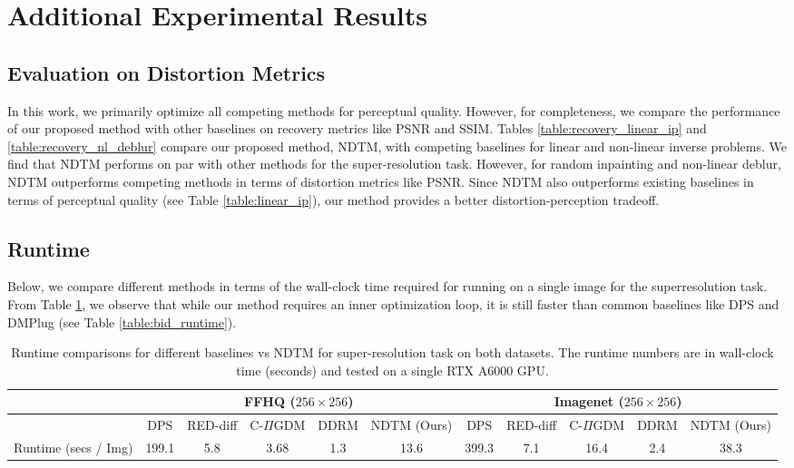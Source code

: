 \section{Additional Experimental Results}
\label{app:add_exp}

 \subsection{Evaluation on Distortion Metrics}
 In this work, we primarily optimize all competing methods for perceptual quality. However, for completeness, we compare the performance of our proposed method with other baselines on recovery metrics like PSNR and SSIM. Tables \ref{table:recovery_linear_ip} and \ref{table:recovery_nl_deblur} compare our proposed method, NDTM, with competing baselines for linear and non-linear inverse problems. We find that NDTM performs on par with other methods for the super-resolution task. However, for random inpainting and non-linear deblur, NDTM outperforms competing methods in terms of distortion metrics like PSNR. Since NDTM also outperforms existing baselines in terms of perceptual quality (see Table \ref{table:linear_ip}), our method provides a better distortion-perception tradeoff. 

\subsection{Runtime}
Below, we compare different methods in terms of the wall-clock time required for running on a single image for the superresolution task. From Table \ref{tab:runtime}, we observe that while our method requires an inner optimization loop, it is still faster than common baselines like DPS and DMPlug (see Table \ref{table:bid_runtime}).

\begin{table}[ht]
\caption{Runtime comparisons for different baselines vs NDTM for super-resolution task on both datasets. The runtime numbers are in wall-clock time (seconds) and tested on a single RTX A6000 GPU.}
\centering
\footnotesize
\setlength{\tabcolsep}{3pt}
\begin{tabular}{@{}cccccc|ccccc@{}}
\toprule
\multicolumn{1}{l}{}                     & \multicolumn{5}{c|}{FFHQ ($256 \times 256$)}       & \multicolumn{5}{c}{Imagenet ($256 \times 256$)}    \\ \midrule
                                         & DPS   & RED-diff & C-$\Pi$GDM & DDRM & NDTM (Ours) & DPS   & RED-diff & C-$\Pi$GDM & DDRM & NDTM (Ours) \\ \midrule
\multicolumn{1}{c}{Runtime (secs / Img)} & 199.1 & 5.8      & 3.68       & 1.3  & 13.6        & 399.3 & 7.1      & 16.4       & 2.4  & 38.3        \\ \bottomrule
\end{tabular}
\label{tab:runtime}
\end{table}

